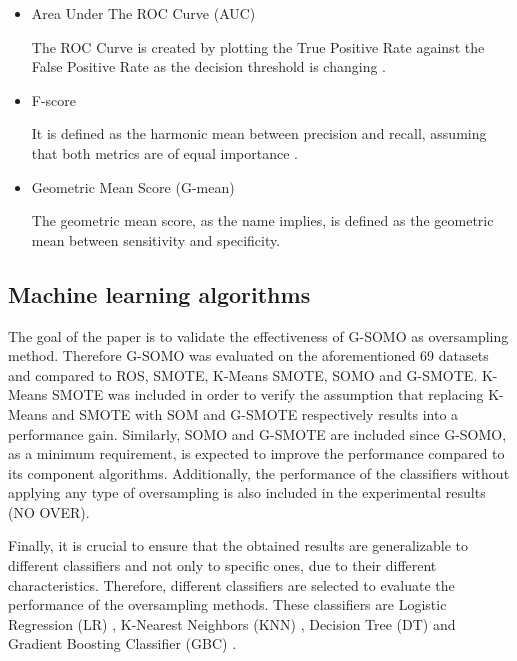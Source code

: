 \documentclass[parskip=full]{scrartcl}
\begin{document}
\begin{itemize}

	\renewcommand\labelitemi{--}

	\item Area Under The ROC Curve (AUC)
	
	The ROC Curve is created by plotting the True Positive Rate against the False Positive Rate as the decision threshold is changing \cite{Hand2009}.

	\item F-score
	
	It is defined as the harmonic mean between precision and recall, assuming that both metrics are of equal importance \cite{Guo2018}.

	\item Geometric Mean Score (G-mean)
	
	The geometric mean score, as the name implies, is defined as the geometric mean between sensitivity and specificity.

\end{itemize}

\subsection{Machine learning algorithms}

The goal of the paper is to validate the effectiveness of G-SOMO as oversampling method. Therefore G-SOMO was evaluated on the aforementioned 69 datasets and compared to ROS, SMOTE, K-Means SMOTE, SOMO and G-SMOTE. K-Means SMOTE was included in order to verify the assumption that replacing K-Means and SMOTE with SOM and G-SMOTE respectively results into a performance gain. Similarly, SOMO and G-SMOTE are included since G-SOMO, as a minimum requirement, is expected to improve the performance compared to its component algorithms. Additionally, the performance of the classifiers without applying any type of oversampling is also included in the experimental results (NO OVER).

Finally, it is crucial to ensure that the obtained results are generalizable to different classifiers and not only to specific ones, due to their different characteristics. Therefore, different classifiers are selected to evaluate the performance of the oversampling methods. These classifiers are Logistic Regression (LR) \cite{McCullagh1989}, K-Nearest Neighbors (KNN) \cite{Cover1967}, Decision Tree (DT) \cite{Salzberg1994} and Gradient Boosting Classifier (GBC) \cite{Friedman2001}.
\end{document}
